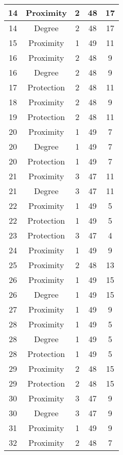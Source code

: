\documentclass[results.tex]{subfiles}
\begin{document}
\begin{center}
\begin{tabular}{| c || c | c | c | c |}
    \hline
    14 & Proximity & 2 & 48 & 17 \\ 
    \hline
    14 & Degree & 2 & 48 & 17 \\ 
    \hline
    15 & Proximity & 1 & 49 & 11 \\ 
    \hline
    16 & Proximity & 2 & 48 & 9 \\ 
    \hline
    16 & Degree & 2 & 48 & 9 \\ 
    \hline
    17 & Protection & 2 & 48 & 11 \\ 
    \hline
    18 & Proximity & 2 & 48 & 9 \\ 
    \hline
    19 & Protection & 2 & 48 & 11 \\ 
    \hline
    20 & Proximity & 1 & 49 & 7 \\ 
    \hline
    20 & Degree & 1 & 49 & 7 \\ 
    \hline
    20 & Protection & 1 & 49 & 7 \\ 
    \hline
    21 & Proximity & 3 & 47 & 11 \\ 
    \hline
    21 & Degree & 3 & 47 & 11 \\ 
    \hline
    22 & Proximity & 1 & 49 & 5 \\ 
    \hline
    22 & Protection & 1 & 49 & 5 \\ 
    \hline
    23 & Protection & 3 & 47 & 4 \\ 
    \hline
    24 & Proximity & 1 & 49 & 9 \\ 
    \hline
    25 & Proximity & 2 & 48 & 13 \\ 
    \hline
    26 & Proximity & 1 & 49 & 15 \\ 
    \hline
    26 & Degree & 1 & 49 & 15 \\ 
    \hline
    27 & Proximity & 1 & 49 & 9 \\ 
    \hline
    28 & Proximity & 1 & 49 & 5 \\ 
    \hline
    28 & Degree & 1 & 49 & 5 \\ 
    \hline
    28 & Protection & 1 & 49 & 5 \\ 
    \hline
    29 & Proximity & 2 & 48 & 15 \\ 
    \hline
    29 & Protection & 2 & 48 & 15 \\ 
    \hline
    30 & Proximity & 3 & 47 & 9 \\ 
    \hline
    30 & Degree & 3 & 47 & 9 \\ 
    \hline
    31 & Proximity & 1 & 49 & 9 \\ 
    \hline
    32 & Proximity & 2 & 48 & 7 \\ 

\end{tabular}
\end{center}
\end{document}

